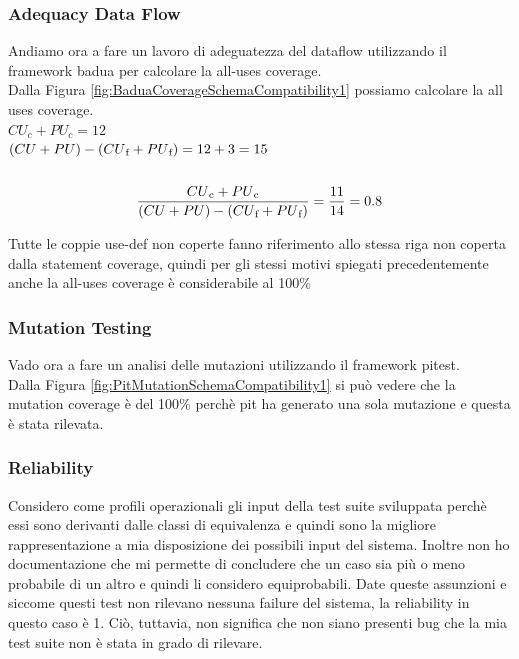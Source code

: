 \documentclass[12pt, a4paper]{article}
\begin{document}
\subsubsection{Adequacy Data Flow}
Andiamo ora a fare un lavoro di adeguatezza del dataflow utilizzando il framework badua per calcolare la all-uses coverage. \\
Dalla Figura \ref{fig:BaduaCoverageSchemaCompatibility1} possiamo calcolare la all uses coverage. \\
\(CU_c + PU_c = 12\) \\
\( (CU + PU) - (CU\textsubscript{f} + PU\textsubscript{f}) = 12 + 3 = 15\) \\ \\
\[\frac{{CU\textsubscript{c} + PU\textsubscript{c}}}{{(CU + PU) - (CU\textsubscript{f} + PU\textsubscript{f})}} = \frac{{11}}{{14}} = 0.8\]

Tutte le coppie use-def non coperte fanno riferimento allo stessa riga non coperta dalla statement coverage, quindi
per gli stessi motivi spiegati precedentemente anche la all-uses coverage è considerabile al 100\%
\subsubsection{Mutation Testing}
Vado ora a fare un analisi delle mutazioni utilizzando il framework pitest. \\
Dalla Figura \ref{fig:PitMutationSchemaCompatibility1} si può vedere che la mutation coverage è del 100\% perchè
pit ha generato una sola mutazione e questa è stata rilevata. \\


\subsubsection{Reliability}
Considero come profili operazionali gli input della test suite sviluppata perchè essi sono derivanti dalle classi di equivalenza
e quindi sono la migliore rappresentazione a mia disposizione dei possibili input del sistema. Inoltre non ho documentazione che
mi permette di concludere che un caso sia più o meno probabile di un altro e quindi li considero equiprobabili. Date queste 
assunzioni e siccome questi test non rilevano nessuna failure del sistema, la reliability in questo caso è 1. Ciò, tuttavia,
 non significa che non siano presenti bug che la mia test suite non è stata in grado di rilevare.
\end{document}
